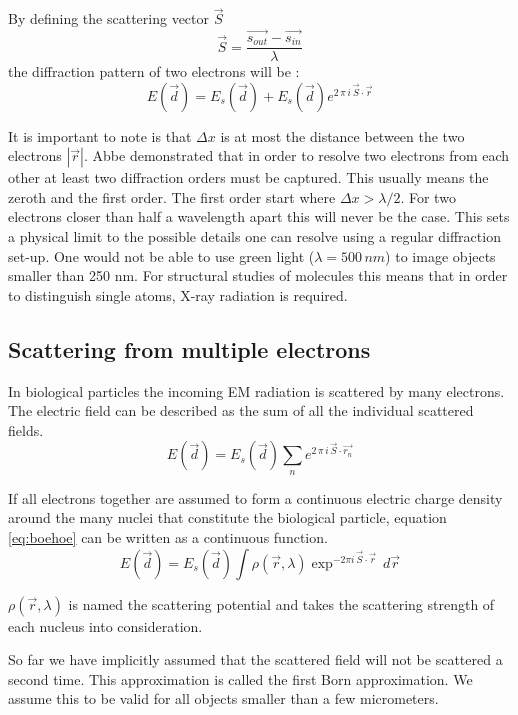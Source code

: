 By defining the scattering vector $\vec{S}$
\begin{equation}
\vec{S} = \frac{\vec{s_{out}}-\vec{s_{in}} }{\lambda}
\end{equation}
the diffraction pattern of two electrons will be :
\begin{equation}
E(\vec{d}) = E_s(\vec{d}) + E_s(\vec{d}) e^{2\,\pi\,  i\,\vec{S}\cdot\vec{r}}
\end{equation}

It is important to note is that $\Delta x $ is at most the distance between the two electrons $|\vec{r}|$. Abbe demonstrated that in order to resolve two electrons from each other at least two diffraction orders must be captured. This usually means the zeroth and the first order. The first order start where $\Delta x > \lambda/2$. For two electrons closer than half a wavelength apart this will never be the case. This sets a physical limit to the possible details one can resolve using a regular diffraction set-up. One would not be able to use green light ($\lambda = 500\,nm$) to image objects smaller than 250 nm. For structural studies of molecules this means that in order to distinguish single atoms, X-ray radiation is required.


\subsection{Scattering from multiple electrons}
In biological particles the incoming EM radiation is scattered by many electrons. The electric field can be described as the sum of all the individual scattered fields.
\begin{equation}\label{eq:boehoe}
E(\vec{d}) = E_s(\vec{d}) \sum_{n} e^{2\,\pi\,  i\,\vec{S}\cdot\vec{r_n}}
\end{equation}

If all electrons together are assumed to form a continuous electric charge density around the many nuclei that constitute the biological particle, equation \ref{eq:boehoe}  can be written as a continuous function. 
\begin{equation}\label{eq:cont}
E(\vec{d}) = E_s(\vec{d})\int \rho(\vec{r},\lambda) \exp^{-2\pi i \,\vec{S} \cdot \vec{r}}\,d\vec{r}
\end{equation}

$\rho(\vec{r},\lambda)$ is named the scattering potential and takes the scattering strength of each nucleus into consideration. 

So far we have implicitly assumed that the scattered field will not be scattered a second time. This approximation is called the first Born approximation. We assume this to be valid for all objects smaller than a few micrometers.

